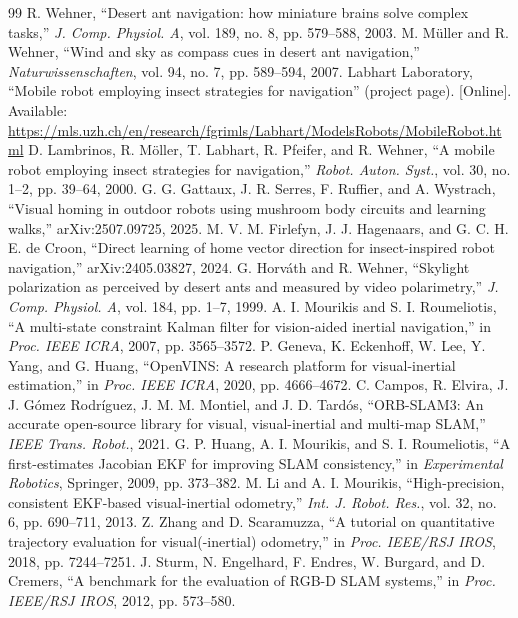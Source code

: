 \documentclass[conference]{IEEEtran}
\begin{document}
\begin{thebibliography}{99}
 R. Wehner, ``Desert ant navigation: how miniature brains solve complex tasks,'' \emph{J. Comp. Physiol. A}, vol. 189, no. 8, pp. 579--588, 2003.
 M. M\"uller and R. Wehner, ``Wind and sky as compass cues in desert ant navigation,'' \emph{Naturwissenschaften}, vol. 94, no. 7, pp. 589--594, 2007.
 Labhart Laboratory, ``Mobile robot employing insect strategies for navigation'' (project page). [Online]. Available: \url{https://mls.uzh.ch/en/research/fgrimls/Labhart/ModelsRobots/MobileRobot.html}
 D. Lambrinos, R. M\"oller, T. Labhart, R. Pfeifer, and R. Wehner, ``A mobile robot employing insect strategies for navigation,'' \emph{Robot. Auton. Syst.}, vol. 30, no. 1--2, pp. 39--64, 2000.
 G. G. Gattaux, J. R. Serres, F. Ruffier, and A. Wystrach, ``Visual homing in outdoor robots using mushroom body circuits and learning walks,'' arXiv:2507.09725, 2025.
 M. V. M. Firlefyn, J. J. Hagenaars, and G. C. H. E. de Croon, ``Direct learning of home vector direction for insect-inspired robot navigation,'' arXiv:2405.03827, 2024.
 G. Horv\'ath and R. Wehner, ``Skylight polarization as perceived by desert ants and measured by video polarimetry,'' \emph{J. Comp. Physiol. A}, vol. 184, pp. 1--7, 1999.
 A. I. Mourikis and S. I. Roumeliotis, ``A multi-state constraint Kalman filter for vision-aided inertial navigation,'' in \emph{Proc. IEEE ICRA}, 2007, pp. 3565--3572.
 P. Geneva, K. Eckenhoff, W. Lee, Y. Yang, and G. Huang, ``OpenVINS: A research platform for visual-inertial estimation,'' in \emph{Proc. IEEE ICRA}, 2020, pp. 4666--4672.
 C. Campos, R. Elvira, J. J. G\'omez Rodr\'iguez, J. M. M. Montiel, and J. D. Tard\'os, ``ORB-SLAM3: An accurate open-source library for visual, visual-inertial and multi-map SLAM,'' \emph{IEEE Trans. Robot.}, 2021.
 G. P. Huang, A. I. Mourikis, and S. I. Roumeliotis, ``A first-estimates Jacobian EKF for improving SLAM consistency,'' in \emph{Experimental Robotics}, Springer, 2009, pp. 373--382.
 M. Li and A. I. Mourikis, ``High-precision, consistent EKF-based visual-inertial odometry,'' \emph{Int. J. Robot. Res.}, vol. 32, no. 6, pp. 690--711, 2013.
 Z. Zhang and D. Scaramuzza, ``A tutorial on quantitative trajectory evaluation for visual(-inertial) odometry,'' in \emph{Proc. IEEE/RSJ IROS}, 2018, pp. 7244--7251.
 J. Sturm, N. Engelhard, F. Endres, W. Burgard, and D. Cremers, ``A benchmark for the evaluation of RGB-D SLAM systems,'' in \emph{Proc. IEEE/RSJ IROS}, 2012, pp. 573--580.

\end{thebibliography}
\end{document}
